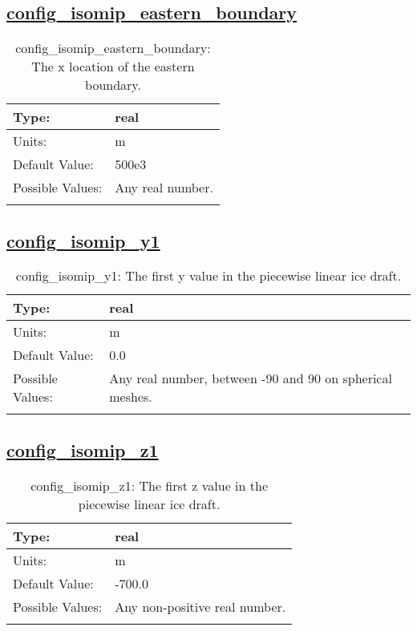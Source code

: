 \subsection[config\_isomip\_eastern\_boundary]{\hyperref[sec:nm_tab_isomip]{config\_isomip\_eastern\_boundary}}
\label{subsec:nm_sec_config_isomip_eastern_boundary}
\begin{center}
\begin{longtable}{| p{2.0in} || p{4.0in} |}
    \hline
    Type: & real \\
    \hline
    Units: & \si{m} \\
    \hline
    Default Value: & 500e3 \\
    \hline
    Possible Values: & Any real number. \\
    \hline
    \caption{config\_isomip\_eastern\_boundary: The x location of the eastern boundary.}
\end{longtable}
\end{center}
\subsection[config\_isomip\_y1]{\hyperref[sec:nm_tab_isomip]{config\_isomip\_y1}}
\label{subsec:nm_sec_config_isomip_y1}
\begin{center}
\begin{longtable}{| p{2.0in} || p{4.0in} |}
    \hline
    Type: & real \\
    \hline
    Units: & \si{m} \\
    \hline
    Default Value: & 0.0 \\
    \hline
    Possible Values: & Any real number, between -90 and 90 on spherical meshes. \\
    \hline
    \caption{config\_isomip\_y1: The first y value in the piecewise linear ice draft.}
\end{longtable}
\end{center}
\subsection[config\_isomip\_z1]{\hyperref[sec:nm_tab_isomip]{config\_isomip\_z1}}
\label{subsec:nm_sec_config_isomip_z1}
\begin{center}
\begin{longtable}{| p{2.0in} || p{4.0in} |}
    \hline
    Type: & real \\
    \hline
    Units: & \si{m} \\
    \hline
    Default Value: & -700.0 \\
    \hline
    Possible Values: & Any non-positive real number. \\
    \hline
    \caption{config\_isomip\_z1: The first z value in the piecewise linear ice draft.}
\end{longtable}
\end{center}
